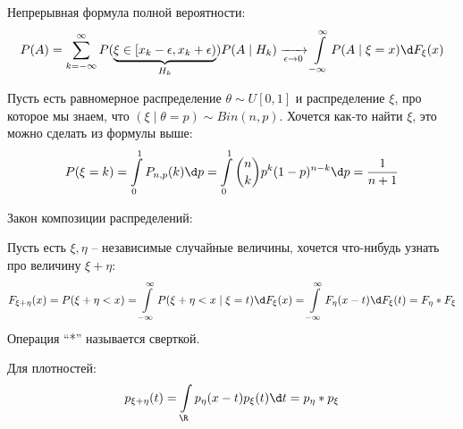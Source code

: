 Непрерывная формула полной вероятности:
$$P(A) = \sum\limits_{k=-\infty}^{\infty} P(\underbrace{\xi \in [x_k - \epsilon, x_k + \epsilon)}_{H_k}) P(A \mid H_k) \xrightarrow[\epsilon \to 0]{} \int\limits_{-\infty}^{\infty} P(A \mid \xi = x) \d F_{\xi}(x)$$

\begin{exmp}
Пусть есть равномерное распределение $\theta \sim U[0, 1]$ и распределение $\xi$, про которое мы знаем, что $(\xi \mid \theta = p) \sim Bin(n, p)$. 
Хочется как-то найти $\xi$, это можно сделать из формулы выше:
$$P(\xi = k) = \int\limits_0^1 P_{n, p}(k) \d p = \int\limits_0^1 {n \choose k} p^k (1 - p)^{n-k} \d p = \frac{1}{n + 1}$$
\end{exmp}

\begin{exmp}
Закон композиции распределений:

Пусть есть $\xi, \eta$ -- независимые случайные величины, хочется что-нибудь узнать про величину $\xi + \eta$:
$$F_{\xi + \eta}(x) = P(\xi + \eta < x) = \int\limits_{-\infty}^{\infty} P(\xi + \eta < x \mid \xi = t) \d F_{\xi}(x) = \int\limits_{-\infty}^{\infty} F_{\eta}(x - t) \d F_{\xi}(t) = F_{\eta} * F_{\xi}$$
Операция ``*'' называется сверткой. 

Для плотностей:
$$p_{\xi + \eta}(t) = \int\limits_{\R} p_{\eta}(x - t) p_{\xi}(t) \d t = p_{\eta} * p_{\xi}$$
\end{exmp}
